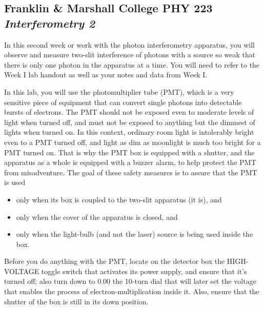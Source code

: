 \documentclass[11pt]{article}
\begin{document}
\begin{center}
\section*{
Franklin \& Marshall College \hfill PHY 223\\
\bigskip
{\Large \it Interferometry 2}}
\end{center}
 
In this second week or work with the photon interferometry apparatus, you will
observe and measure two-slit interference of photons with a source so weak that
there is only one photon in the apparatus at a time. You will need to refer to
the Week I lab handout as well as your notes and data from Week I.

\vspace{5mm}


In this lab, you will use the photomultiplier tube (PMT), which is a very
sensitive piece of equipment that can convert single photons into detectable
bursts of electrons. The PMT should not be exposed even to moderate levels of
light when turned off, and must not be exposed to anything but the dimmest of
lights when turned on. In this context, ordinary room light is intolerably
bright even to a PMT turned off, and light as dim as moonlight is much too
bright for a PMT turned on. That is why the PMT box is equipped with a shutter,
and the apparatus as a whole is equipped with a buzzer alarm, to help protect
the PMT from misadventure. The goal of these safety measures is to assure that
the PMT is used

\begin{itemize}
\item only when its box is coupled to the two-slit apparatus (it is), and
\item only when the cover of the apparatus is closed, and
\item only when the light-bulb (and not the laser) source is being used inside
the box.
\end{itemize}

Before you do anything with the PMT, locate on the detector box the HIGH-VOLTAGE
toggle switch that activates its power supply, and ensure that it’s turned off;
also turn down to 0.00 the 10-turn dial that will later set the voltage that
enables the process of electron-multiplication inside it. Also, ensure that the
shutter of the box is still in its down position.
\end{document}
